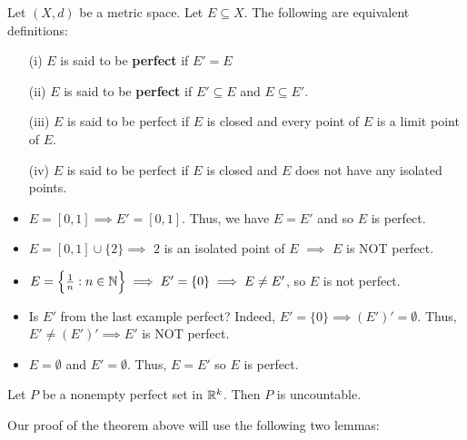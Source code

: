 \documentclass[a4paper]{report}
\begin{document}
\begin{definition}
    Let \( (X,d) \) be a metric space. Let \( E \subseteq  X  \). The following are equivalent definitions:
    \begin{enumerate}
        \item[(i)] \( E  \) is said to be \textbf{perfect} if \( E' = E \) 
        \item[(ii)] \( E  \) is said to be \textbf{perfect} if \( E' \subseteq E   \) and \( E \subseteq  E' \). 
        \item[(iii)] \( E  \) is said to be perfect if \( E  \) is closed and every point of \( E  \) is a limit point of \( E  \).
        \item[(iv)] \( E  \) is said to be perfect if \( E  \) is closed and \( E  \) does not have any isolated points.
    \end{enumerate}
\end{definition}

\begin{eg}
    \begin{itemize}
        \item \( E = [0,1] \implies E' = [0,1] \). Thus, we have \( E = E' \) and so \( E  \) is perfect.
        \item \( E = [0,1] \cup \{ 2 \} \implies  \) \( 2  \) is an isolated point of \( E  \) \( \implies  \) \( E  \) is NOT perfect.
        \item \( E = \Big\{ \frac{ 1 }{ n } : n \in \mathbb{N}   \Big\} \implies E' = \{ 0  \} \implies  E \neq E' \), so \( E  \) is not perfect. 
        \item Is \( E' \) from the last example perfect? Indeed, \( E' = \{ 0  \}  \implies (E')' = \emptyset\). Thus, \( E' \neq (E')' \implies E' \) is NOT perfect.
        \item \( E = \emptyset \) and \( E' = \emptyset \). Thus, \( E = E' \) so \( E  \) is perfect.
    \end{itemize}  
\end{eg}

\begin{theorem}[ ]
    Let \( P  \) be a nonempty perfect set in \( \mathbb{R}^{k} \). Then \( P \) is uncountable.
\end{theorem}

Our proof of the theorem above will use the following two lemmas:
\end{document}
